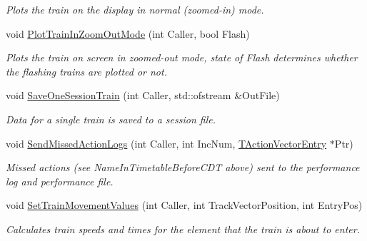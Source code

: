\begin{DoxyCompactItemize}
\begin{DoxyCompactList}\small\item\em Plots the train on the display in normal (zoomed-\/in) mode. \end{DoxyCompactList}\item 
\mbox{\label{class_t_train_aa3f3a500264ddca35c7fee35f22ffa1e}} 
void \mbox{\hyperlink{class_t_train_aa3f3a500264ddca35c7fee35f22ffa1e}{Plot\+Train\+In\+Zoom\+Out\+Mode}} (int Caller, bool Flash)
\begin{DoxyCompactList}\small\item\em Plots the train on screen in zoomed-\/out mode, state of \textquotesingle{}Flash\textquotesingle{} determines whether the flashing trains are plotted or not. \end{DoxyCompactList}\item 
\mbox{\label{class_t_train_ac414e9e4fd7e25c11e09678dd4dc7944}} 
void \mbox{\hyperlink{class_t_train_ac414e9e4fd7e25c11e09678dd4dc7944}{Save\+One\+Session\+Train}} (int Caller, std\+::ofstream \&Out\+File)
\begin{DoxyCompactList}\small\item\em Data for a single train is saved to a session file. \end{DoxyCompactList}\item 
\mbox{\label{class_t_train_a29ad7cb992931e1e8922941fc49e2e74}} 
void \mbox{\hyperlink{class_t_train_a29ad7cb992931e1e8922941fc49e2e74}{Send\+Missed\+Action\+Logs}} (int Caller, int Inc\+Num, \mbox{\hyperlink{class_t_action_vector_entry}{T\+Action\+Vector\+Entry}} $\ast$Ptr)
\begin{DoxyCompactList}\small\item\em Missed actions (see Name\+In\+Timetable\+Before\+C\+DT above) sent to the performance log and performance file. \end{DoxyCompactList}\item 
\mbox{\label{class_t_train_aaa6289d279b229d05963f8b3a35d53e9}} 
void \mbox{\hyperlink{class_t_train_aaa6289d279b229d05963f8b3a35d53e9}{Set\+Train\+Movement\+Values}} (int Caller, int Track\+Vector\+Position, int Entry\+Pos)
\begin{DoxyCompactList}\small\item\em Calculates train speeds and times for the element that the train is about to enter. \end{DoxyCompactList}\item 

\end{DoxyCompactItemize}
